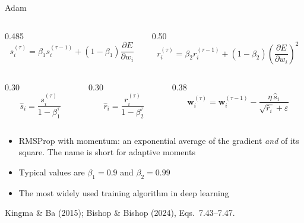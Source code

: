 \documentclass[aspectratio=169, 11pt]{beamer}
\newcommand{\srcline}[1]{%
  \par\vspace{0.25em}%
  {\scriptsize\color{mcMuted}\hfill #1\par}}
\begin{document}
\begin{frame}{Adam}
  \vspace{-0.55em}
  \begin{columns}[T, onlytextwidth]
    \begin{column}{0.485\textwidth}
      \[ s^{(\tau)}_i = \beta_1 s^{(\tau-1)}_i
         + (1-\beta_1)\frac{\partial E}{\partial w_i} \]
    \end{column}
    \begin{column}{0.50\textwidth}
      \[ r^{(\tau)}_i = \beta_2 r^{(\tau-1)}_i
         + (1-\beta_2)\left(\frac{\partial E}{\partial w_i}\right)^{2} \]
    \end{column}
  \end{columns}
  \vspace{-0.55em}
  \begin{columns}[T, onlytextwidth]
    \begin{column}{0.30\textwidth}
      \[ \hat s_i = \frac{s^{(\tau)}_i}{1-\beta_1^{\tau}} \]
    \end{column}
    \begin{column}{0.30\textwidth}
      \[ \hat r_i = \frac{r^{(\tau)}_i}{1-\beta_2^{\tau}} \]
    \end{column}
    \begin{column}{0.38\textwidth}
      \[ \mathbf{w}^{(\tau)}_i = \mathbf{w}^{(\tau-1)}_i
         - \frac{\eta\,\hat s_i}{\sqrt{\hat r_i} + \varepsilon} \]
    \end{column}
  \end{columns}
  \vspace{0.1em}
  \begin{itemize}\itemsep0.3em
    \item RMSProp with momentum: an exponential average of the gradient
          \emph{and} of its square. The name is short for
          \alert{adaptive moments}
    \item Typical values are $\beta_1 = 0.9$ and $\beta_2 = 0.99$
    \item The most widely used training algorithm in deep learning
  \end{itemize}
  \srcline{Kingma \& Ba (2015); Bishop \& Bishop (2024),
  Eqs.~7.43--7.47.}
\end{frame}
\end{document}
